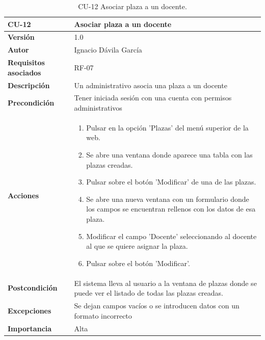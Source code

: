 \begin{table}[p]
	\centering
	\begin{tabularx}{\linewidth}{ p{} p{} }
		\toprule
		\textbf{CU-12}    & \textbf{Asociar plaza a un docente}\\
		\toprule
		\textbf{Versión}              & 1.0    \\
		\textbf{Autor}                & Ignacio Dávila García \\
		\textbf{Requisitos asociados} & RF-07 \\
		\textbf{Descripción}          & Un administrativo asocia una plaza a un docente \\
		\textbf{Precondición}         & Tener iniciada sesión con una cuenta con permisos administrativos \\
		\textbf{Acciones}             &
		\begin{enumerate}
			\def\labelenumi{\arabic{enumi}.}
			\tightlist
			\item Pulsar en la opción 'Plazas' del menú superior de la web.
			\item Se abre una ventana donde aparece una tabla con las plazas creadas.
			\item Pulsar sobre el botón 'Modificar' de una de las plazas.
			\item Se abre una nueva ventana con un formulario donde los campos se encuentran rellenos con los datos de esa plaza.
			\item Modificar el campo 'Docente' seleccionando al docente al que se quiere asignar la plaza.
			\item Pulsar sobre el botón 'Modificar'.
		\end{enumerate}\\
		\textbf{Postcondición}        & El sistema lleva al usuario a la ventana de plazas donde se puede ver el listado de todas las plazas creadas. \\
		\textbf{Excepciones}          & Se dejan campos vacíos o se introducen datos con un formato incorrecto \\
		\textbf{Importancia}          & Alta \\
		\bottomrule
	\end{tabularx}
	\caption{CU-12 Asociar plaza a un docente.}
\end{table}
\FloatBarrier

